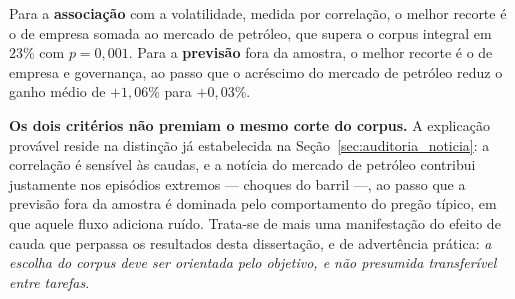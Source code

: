 Para a \textbf{associação} com a volatilidade, medida por correlação, o melhor recorte é o de
empresa somada ao mercado de petróleo, que supera o corpus integral em $23\%$ com $p = 0{,}001$.
Para a \textbf{previsão} fora da amostra, o melhor recorte é o de empresa e governança, ao passo que
o acréscimo do mercado de petróleo reduz o ganho médio de $+1{,}06\%$ para $+0{,}03\%$.

\textbf{Os dois critérios não premiam o mesmo corte do corpus.} A explicação provável reside na
distinção já estabelecida na Seção~\ref{sec:auditoria_noticia}: a correlação é sensível às caudas,
e a notícia do mercado de petróleo contribui justamente nos episódios extremos --- choques do
barril ---, ao passo que a previsão fora da amostra é dominada pelo comportamento do pregão típico,
em que aquele fluxo adiciona ruído. Trata-se de mais uma manifestação do efeito de cauda que
perpassa os resultados desta dissertação, e de advertência prática: \emph{a escolha do corpus deve
ser orientada pelo objetivo, e não presumida transferível entre tarefas}.
